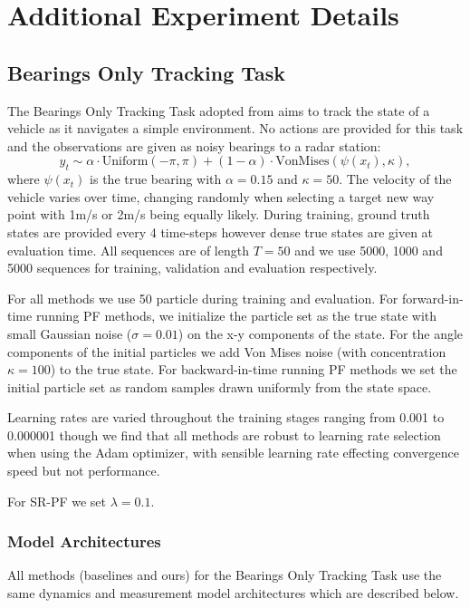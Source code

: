 \newpage
\section{Additional Experiment Details}

\subsection{Bearings Only Tracking Task}
    The Bearings Only Tracking Task adopted from \citet{younis2023mdpf} aims to track the state of a vehicle as it navigates a simple environment. No actions are provided for this task and the observations are given as noisy bearings to a radar station:
     \begin{equation*}
            y_t \sim \alpha \cdot \text{Uniform}(-\pi, \pi) + (1-\alpha) \cdot \text{VonMises}(\psi(x_t), \kappa),
    \end{equation*}	
    where $\psi(x_t)$ is the true bearing with $\alpha=0.15$ and $\kappa=50$. The velocity of the vehicle varies over time, changing randomly when selecting a target new way point with 1m/s or 2m/s being equally likely.  During training, ground truth states are provided every 4 time-steps however dense true states are given at evaluation time.  All sequences are of length $T=50$ and we use 5000, 1000 and 5000 sequences for training, validation and evaluation respectively. 
    
    For all methods we use 50 particle during training and evaluation. For forward-in-time running PF methods, we initialize the particle set as the true state with small Gaussian noise ($\sigma = 0.01$) on the x-y components of the state. For the angle components of the initial particles we add Von Mises noise (with concentration $\kappa=100$) to the true state. For backward-in-time running PF methods we set the initial particle set as random samples drawn uniformly from the state space. 
        
    Learning rates are varied throughout the training stages ranging from 0.001 to 0.000001 though we find that all methods are robust to learning rate selection when using the Adam \cite{DBLP:journals/corr/KingmaB14} optimizer, with sensible learning rate effecting convergence speed but not performance.

    For SR-PF \cite{pmlr-v87-karkus18a_soft_resampling} we set $\lambda=0.1$.
    
    \subsubsection{Model Architectures}
        All methods (baselines and ours) for the Bearings Only Tracking Task use the same dynamics and measurement model architectures which are described below.

